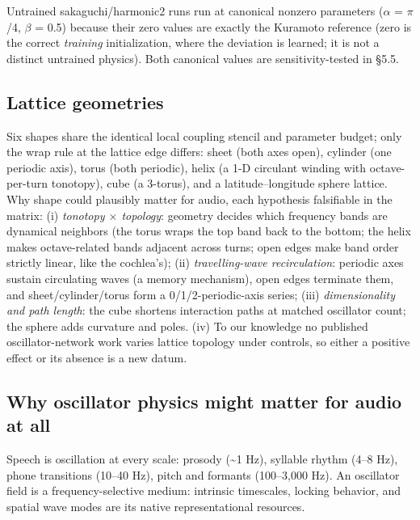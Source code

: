 \documentclass{article}
\begin{document}
Untrained sakaguchi/harmonic2 runs run at canonical nonzero parameters
(\ensuremath{\alpha} = \ensuremath{\pi}/4, \ensuremath{\beta} = 0.5)
because their zero values are exactly the Kuramoto reference (zero is
the correct \emph{training} initialization, where the deviation is
learned; it is not a distinct untrained physics). Both canonical values
are sensitivity-tested in §5.5.

\subsection{Lattice geometries}\label{lattice-geometries}

Six shapes share the identical local coupling stencil and parameter
budget; only the wrap rule at the lattice edge differs: sheet (both axes
open), cylinder (one periodic axis), torus (both periodic), helix (a 1-D
circulant winding with octave-per-turn tonotopy), cube (a 3-torus), and
a latitude--longitude sphere lattice. Why shape could plausibly matter
for audio, each hypothesis falsifiable in the matrix: (i) \emph{tonotopy
\ensuremath{\times} topology}: geometry decides which frequency bands
are dynamical neighbors (the torus wraps the top band back to the
bottom; the helix makes octave-related bands adjacent across turns; open
edges make band order strictly linear, like the cochlea's); (ii)
\emph{travelling-wave recirculation}: periodic axes sustain circulating
waves (a memory mechanism), open edges terminate them, and
sheet/cylinder/torus form a 0/1/2-periodic-axis series; (iii)
\emph{dimensionality and path length}: the cube shortens interaction
paths at matched oscillator count; the sphere adds curvature and poles.
(iv) To our knowledge no published oscillator-network work varies
lattice topology under controls, so either a positive effect or its
absence is a new datum.

\subsection{Why oscillator physics might matter for audio at
all}\label{why-oscillator-physics-might-matter-for-audio-at-all}

Speech is oscillation at every scale: prosody (\textasciitilde1 Hz),
syllable rhythm (4--8 Hz), phone transitions (10--40 Hz), pitch and
formants (100--3,000 Hz). An oscillator field is a frequency-selective
medium: intrinsic timescales, locking behavior, and spatial wave modes
are its native representational resources.
\end{document}
